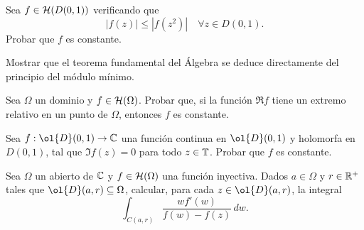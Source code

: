 \begin{ejercicio}
    Sea $f\in \mathcal{H}(D(0,1))$ verificando que
    \begin{equation*}
        |f(z)| \leq |f(z^2)| \quad \forall z\in D(0,1).
    \end{equation*}
    Probar que $f$ es constante.
\end{ejercicio}

\begin{ejercicio}
    Mostrar que el teorema fundamental del Álgebra se deduce directamente del principio del módulo mínimo.
\end{ejercicio}

\begin{ejercicio}
    Sea $\Omega$ un dominio y $f\in \mathcal{H}(\Omega)$. Probar que, si la función $\Re f$ tiene un extremo relativo en un punto de $\Omega$, entonces $f$ es constante.
\end{ejercicio}

\begin{ejercicio}
    Sea $f : \ol{D}(0,1) \to \bb{C}$ una función continua en $\ol{D}(0,1)$ y holomorfa en $D(0,1)$, tal que $\Im f(z) = 0$ para todo $z\in \mathbb{T}$. Probar que $f$ es constante.
\end{ejercicio}

\begin{ejercicio}
    Sea $\Omega$ un abierto de $\mathbb{C}$ y $f\in \mathcal{H}(\Omega)$ una función inyectiva. Dados $a\in \Omega$ y $r\in \mathbb{R}^+$ tales que $\ol{D}(a,r) \subseteq \Omega$, calcular, para cada $z\in \ol{D}(a,r)$, la integral
    \begin{equation*}
        \int_{C(a,r)} \frac{w f'(w)}{f(w) - f(z)} \, dw.
    \end{equation*}
\end{ejercicio}
